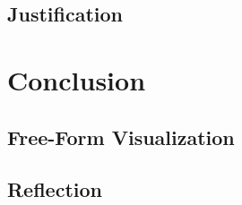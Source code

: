 \documentclass[12pt,a4paper]{article}
\begin{document}
\subsection*{Justification}
%
%
\section{Conclusion}
%
\subsection*{Free-Form Visualization}
%
\subsection*{Reflection}
%
\end{document}
